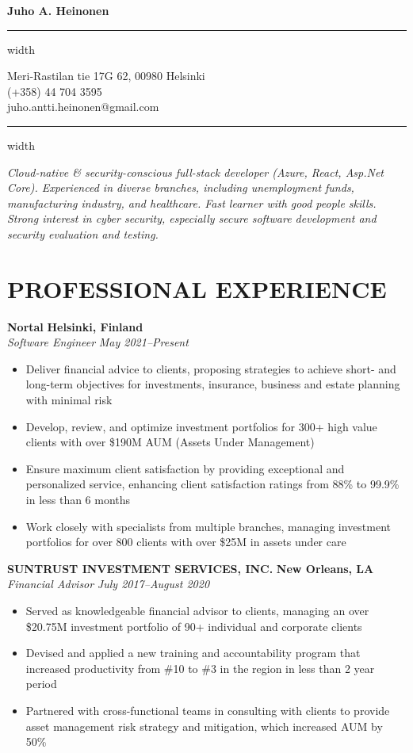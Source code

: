 \documentclass[11pt,letterpaper]{article}
\newcommand{\name}[1]{
  \begin{center}
    \Huge\textbf{#1}
  \end{center}
  \vspace{-0.5em}
  \hrule height 0.4pt width \textwidth
  \vspace{0.5em}
}
\newcommand{\contact}[3]{
  \begin{center}
    #1 \\
    #2 \\
    #3
  \end{center}
  \vspace{-0.5em}
  \hrule height 0.4pt width \textwidth
  \vspace{0.5em}
}
\newcommand{\role}[4]{
  \begin{center}
  \textbf{#1} \hfill \textbf{#2} \\
  \textit{#3} \hfill \textit{#4}
  \end{center}
}
\begin{document}
\name{Juho A. Heinonen}
\vspace{-0.5em}
\contact{Meri-Rastilan tie 17G 62, 00980 Helsinki}{(+358) 44 704 3595}{juho.antti.heinonen@gmail.com}

\vspace{-0.5em}
\begin{center}
\textit{Cloud-native \& security-conscious full-stack developer (Azure, React, Asp.Net Core). Experienced in diverse branches, including unemployment funds, manufacturing industry, and healthcare. Fast learner with good people skills. Strong interest in cyber security, especially secure software development and security evaluation and testing.}
\end{center}

\section{PROFESSIONAL EXPERIENCE}

\vspace{1em}
\role{Nortal}{Helsinki, Finland}{Software Engineer}{May 2021--Present}
\begin{itemize}[leftmargin=*,nosep]
  \item Deliver financial advice to clients, proposing strategies to achieve short- and long-term objectives for investments, insurance, business and estate planning with minimal risk
  \item Develop, review, and optimize investment portfolios for 300+ high value clients with over \$190M AUM (Assets Under Management)
  \item Ensure maximum client satisfaction by providing exceptional and personalized service, enhancing client satisfaction ratings from 88\% to 99.9\% in less than 6 months
  \item Work closely with specialists from multiple branches, managing investment portfolios for over 800 clients with over \$25M in assets under care
\end{itemize}

\role{SUNTRUST INVESTMENT SERVICES, INC.}{New Orleans, LA}{Financial Advisor}{July 2017--August 2020}
\begin{itemize}[leftmargin=*,nosep,topsep=0pt]
  \item Served as knowledgeable financial advisor to clients, managing an over \$20.75M investment portfolio of 90+ individual and corporate clients
  \item Devised and applied a new training and accountability program that increased productivity from \#10 to \#3 in the region in less than 2 year period
  \item Partnered with cross-functional teams in consulting with clients to provide asset management risk strategy and mitigation, which increased AUM by 50\%
\end{itemize}
\end{document}
